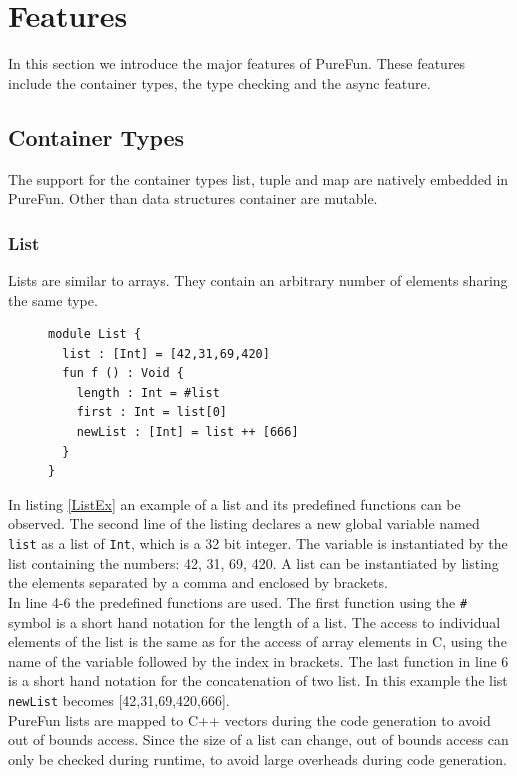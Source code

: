 \section{Features}
In this section we introduce the major features of PureFun. These features include the container types, the type checking and the async feature.
\subsection{Container Types}
The support for the container types list, tuple and map are natively embedded in PureFun. Other than data structures container are mutable.
\subsubsection{List}
Lists are similar to arrays. They contain an arbitrary number of elements sharing the same type.\\
\begin{figure}
\begin{lstlisting}[caption={PureFun code with a list and its predefined functions.},label={ListEx}]
module List {
  list : [Int] = [42,31,69,420]
  fun f () : Void {
    length : Int = #list
    first : Int = list[0]
    newList : [Int] = list ++ [666]
  }
}
\end{lstlisting}
\end{figure}
In listing \ref{ListEx} an example of a list and its predefined functions can be observed. The second line of the listing declares a new global variable named \texttt{list} as a list of \texttt{Int}, which is a 32 bit integer. The variable is instantiated by the list containing the numbers: 42, 31, 69, 420. A list can be instantiated by listing the elements separated by a comma and enclosed by brackets.\\
In line 4-6 the predefined functions are used. The first function using the \texttt{\#} symbol is a short hand notation for the length of a list. The access to individual elements of the list is the same as for the access of array elements in C, using the name of the variable followed by the index in brackets. The last function in line 6 is a short hand notation for the concatenation of two list. In this example the list \texttt{newList} becomes [42,31,69,420,666].\\
PureFun lists are mapped to C++ vectors during the code generation to avoid out of bounds access. Since the size of a list can change, out of bounds access can only be checked during runtime, to avoid large overheads during code generation.
